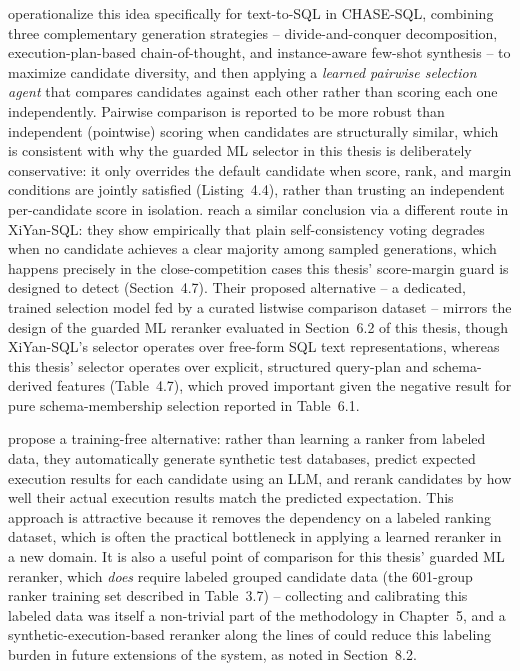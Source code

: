 \documentclass[
  12pt,
  english,
  oneside]{report}
\begin{document}
\citet{pourreza2024chasesql} operationalize this idea specifically for
text-to-SQL in CHASE-SQL, combining three complementary generation
strategies -- divide-and-conquer decomposition, execution-plan-based
chain-of-thought, and instance-aware few-shot synthesis -- to maximize
candidate diversity, and then applying a \emph{learned pairwise selection
agent} that compares candidates against each other rather than scoring
each one independently. Pairwise comparison is reported to be more robust
than independent (pointwise) scoring when candidates are structurally
similar, which is consistent with why the guarded ML selector in this
thesis is deliberately conservative: it only overrides the default
candidate when score, rank, and margin conditions are jointly satisfied
(Listing~4.4), rather than trusting an independent per-candidate score in
isolation. \citet{li2025xiyansql} reach a similar conclusion via a
different route in XiYan-SQL: they show empirically that plain
self-consistency voting degrades when no candidate achieves a clear
majority among sampled generations, which happens precisely in the
close-competition cases this thesis' score-margin guard is designed to
detect (Section~4.7). Their proposed alternative -- a dedicated,
trained selection model fed by a curated listwise comparison dataset --
mirrors the design of the guarded ML reranker evaluated in Section~6.2 of
this thesis, though XiYan-SQL's selector operates over free-form SQL text
representations, whereas this thesis' selector operates over explicit,
structured query-plan and schema-derived features (Table~4.7), which
proved important given the negative result for pure schema-membership
selection reported in Table~6.1.

\citet{li2024usingllm} propose a training-free alternative: rather than
learning a ranker from labeled data, they automatically generate synthetic
test databases, predict expected execution results for each candidate
using an LLM, and rerank candidates by how well their actual execution
results match the predicted expectation. This approach is attractive
because it removes the dependency on a labeled ranking dataset, which is
often the practical bottleneck in applying a learned reranker in a new
domain. It is also a useful point of comparison for this thesis' guarded
ML reranker, which \emph{does} require labeled grouped candidate data
(the 601-group ranker training set described in Table~3.7) -- collecting
and calibrating this labeled data was itself a non-trivial part of the
methodology in Chapter~5, and a synthetic-execution-based reranker along
the lines of \citet{li2024usingllm} could reduce this labeling burden in
future extensions of the system, as noted in Section~8.2.
\end{document}
